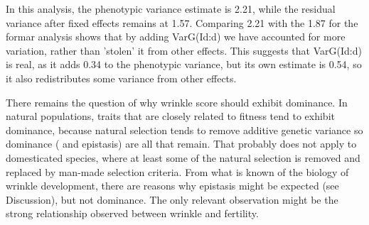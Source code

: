 \documentclass[titlepage]{article}  %
\begin{document}
In this analysis, the phenotypic variance estimate is 2.21, while the residual variance after fixed effects remains at 1.57. Comparing 2.21 with the 1.87 for the formar analysis shows that by adding VarG(Id:d) we have accounted for more variation, rather than 'stolen' it from other effects. This suggests that VarG(Id:d) is real, as it adds 0.34 to the phenotypic variance, but its own estimate is 0.54, so it also redistributes some variance from other effects.

There remains the question of why wrinkle score should exhibit dominance. In natural populations, traits that are closely related to fitness tend to exhibit dominance, because natural selection tends to remove additive genetic variance so dominance ( and epistasis) are all that remain. That probably does not apply to domesticated species, where at least some of the natural selection is removed and replaced by man-made selection criteria. From what is known of the biology of wrinkle development, there are reasons why epistasis might be expected (see Discussion), but not dominance.  The only relevant observation might be the strong relationship observed between wrinkle and fertility.
\end{document}
